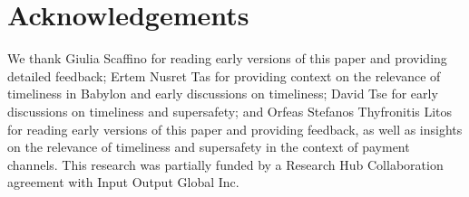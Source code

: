 \section{Acknowledgements}

We thank Giulia Scaffino for reading early versions of this paper
and providing detailed feedback;
Ertem Nusret Tas for providing context on the relevance
of timeliness in Babylon and early discussions on timeliness;
David Tse for early discussions on timeliness and supersafety;
and Orfeas Stefanos Thyfronitis Litos for reading early versions of this paper
and providing feedback, as well as insights on the relevance
of timeliness and supersafety in the context of payment channels.
This research was partially funded by a Research Hub Collaboration agreement
with Input Output Global Inc.